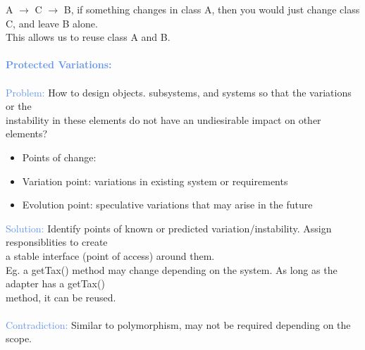 \documentclass[a4paper,10pt]{article}
\begin{document}
\indent A $\rightarrow$ C $\rightarrow$ B, if something changes in class A, then you would just change class C, and leave B alone. \\
\indent This allows us to reuse class A and B. \\\\
\textcolor{CornflowerBlue}{\textbf{Protected Variations:}} \\\\
\indent \textcolor{CornflowerBlue}{Problem:} How to design objects. subsystems, and systems so that the variations or the \\ \indent instability in these elements do not have an undiesirable impact on other elements? 
\renewcommand{\labelitemi}{\textperiodcentered}
\begin{itemize}
\item Points of change: 
\item Variation point: variations in existing system or requirements 
\item Evolution point: speculative variations that may arise in the future
\end{itemize}
\indent \indent  \textcolor{CornflowerBlue}{Solution:} Identify points of known or predicted variation/instability. Assign responsiblities to create \\
\indent a stable interface (point of access) around them. \\
\indent Eg. a getTax() method may change depending on the system. As long as the adapter has a getTax() \\
\indent method, it can be reused. \\\\
\indent \textcolor{CornflowerBlue}{Contradiction:} Similar to polymorphism, may not be required depending on the scope. \\\\
\newpage
\end{document}
